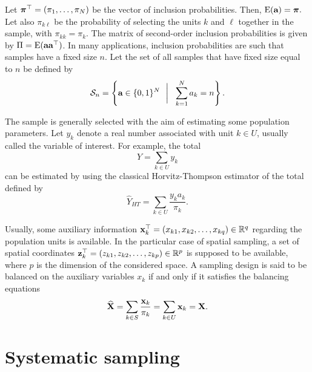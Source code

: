 \documentclass[12pt,english]{article}\usepackage[]{graphicx}\usepackage{xcolor}
\begin{document}
Let $\boldsymbol{\pi}^\top=(\pi_1,\dots,\pi_N)$ be the vector of inclusion probabilities. Then, $\textrm{E}({\textbf{a}})=\boldsymbol{\pi}.$ Let also $\pi_{k\ell}$ be the probability of selecting the units $k$ and $\ell$ together in the sample, with $\pi_{kk} = \pi_k$. The matrix of second-order inclusion probabilities is given by $\Pi = {\rm E}(\textbf{a}\textbf{a}^\top)$. In many applications, inclusion probabilities are such that samples have a fixed size $n$. Let the set of all samples that have fixed size equal to $n$ be defined by
 \begin{equation*}\label{eq:sn} \mathcal{S}_n = \left\{ \textbf{a}\in \{0,1\}^N ~~\bigg|~~ \sum_{k
= 1}^N a_k = n \right\} .
 \end{equation*}

The sample is generally selected with the aim of estimating some population parameters. Let $y_k$ denote a real number associated with unit $k\in U$, usually called the variable of interest. For example, the total
$$
Y=\sum_{k\in U} y_k
$$
can be estimated by using the classical Horvitz-Thompson estimator of the total defined by
\begin{equation}\label{eq:HT}
\widehat{Y}_{HT} = \sum_{k\in U} \frac{y_k a_k}{\pi_k}.
\end{equation}


Usually, some auxiliary information ${\bf x}_k^\top = (x_{k1},x_{k2},\dots,x_{kq}) \in\mathbb{R}^q$  regarding the population units is available.
In the particular case of spatial sampling, a set of spatial coordinates  ${\bf z}_k^\top = (z_{k1},z_{k2},\dots,z_{kp}) \in \mathbb{R}^p$ is supposed to be available, where $p$ is the dimension of the considered space. A sampling design is said to be balanced on the auxiliary variables $x_k$ if and only if it satisfies the balancing equations
\begin{equation*}\label{eq:balance}
  \widehat{{\bf X}} = \sum_{k\in S} \frac{{\bf x}_k}{\pi_k} = \sum_{k\in U} {\bf x}_k = {\bf X}.
\end{equation*}







\section{Systematic sampling}
\end{document}
